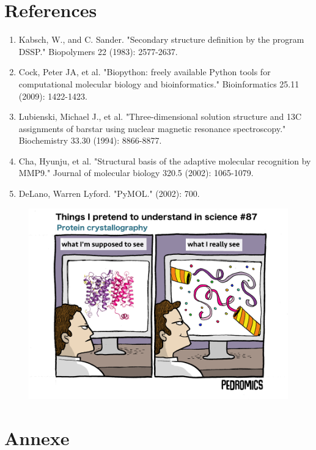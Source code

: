\documentclass[12pt]{article}
\begin{document}
\section{References}
\begin{enumerate}
	\item Kabsch, W., and C. Sander. "Secondary structure definition by the program DSSP." Biopolymers 22 (1983): 2577-2637.
	\item Cock, Peter JA, et al. "Biopython: freely available Python tools for computational molecular biology and bioinformatics." Bioinformatics 25.11 (2009): 1422-1423.
	\item Lubienski, Michael J., et al. "Three-dimensional solution structure and 13C assignments of barstar using nuclear magnetic resonance spectroscopy." Biochemistry 33.30 (1994): 8866-8877.
	\item Cha, Hyunju, et al. "Structural basis of the adaptive molecular recognition by MMP9." Journal of molecular biology 320.5 (2002): 1065-1079.
	\item DeLano, Warren Lyford. "PyMOL." (2002): 700.
\end{enumerate}
\begin{figure}[h!]
	\centering
	\includegraphics[totalheight=8cm]{img/pedromics.png}
	\label{fig:verticalcell}
\end{figure}
\clearpage
\section{Annexe}
\end{document}
